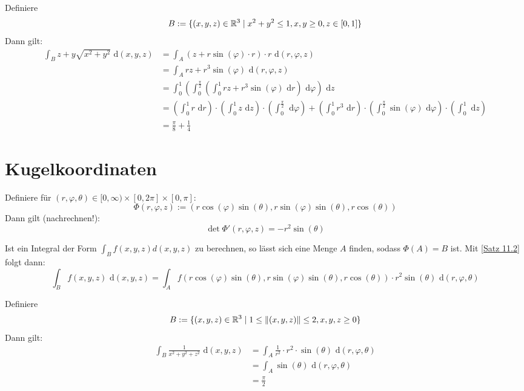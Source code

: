 \documentclass[a4paper,twoside,DIV15,BCOR12mm,chapterprefix=true,headings=onelinechapter]{scrbook}
\begin{document}
\begin{beispiel}
Definiere
\[B:=\{(x,y,z)\in\mathbb{R}^3\mid x^2+y^2\le 1, x,y\ge 0,z\in[0,1]\}\]
Dann gilt:
\begin{align*}
\int_B z+y\sqrt{x^2+y^2}\text{ d}(x,y,z)&=\int_A(z+r\sin(\varphi)\cdot r)\cdot r\text{ d}(r,\varphi,z)\\
&=\int_A rz+r^3\sin(\varphi)\text{ d}(r,\varphi,z)\\
&=\int_0^1(\int_0^{\frac\pi 2}(\int_0^1 rz+r^3\sin(\varphi)\text{ d}r)\text{ d}\varphi)\text{ d}z\\
&=(\int_0^1 r\text{ d}r)\cdot(\int_0^1 z\text{ d}z)\cdot(\int_0^{\frac\pi 2} \text{ d}\varphi)+ (\int_0^1 r^3\text{ d}r)\cdot(\int_0^{\frac\pi 2} \sin(\varphi)\text{ d}\varphi)\cdot(\int_0^1 \text{ d}z)\\
&= \frac\pi 8+\frac14
\end{align*}
\end{beispiel}

\section{Kugelkoordinaten}
Definiere für $(r,\varphi,\theta)\in [0,\infty)\times[0,2\pi]\times[0,\pi]$:
\[\Phi(r,\varphi,z):=(r\cos(\varphi)\sin(\theta),r\sin(\varphi)\sin(\theta),r\cos(\theta))\]
Dann gilt (nachrechnen!):
\[\det\Phi'(r,\varphi,z)= -r^2\sin(\theta)\]

\begin{bemerkung}
Ist ein Integral der Form $\int_B f(x,y,z) d(x,y,z)$ zu berechnen, so lässt sich eine Menge $A$ finden, sodass $\Phi(A) = B$ ist.
Mit \ref{Satz 11.2} folgt dann:
\[\int_B f(x,y,z) \text{ d}(x,y,z) = \int_A f(r\cos(\varphi)\sin(\theta),r\sin(\varphi)\sin(\theta),r\cos(\theta)) \cdot r^2\sin(\theta) \text{ d}(r,\varphi,\theta)\]
\end{bemerkung}

\begin{beispiel}
Definiere
\[B:=\{(x,y,z)\in\mathbb{R}^3\mid 1\le \|(x,y,z)\|\le 2, x,y,z\ge 0\}\]
Dann gilt:
\begin{align*}
\int_B \frac1{x^2+y^2+z^2}\text{ d}(x,y,z)&=\int_A \frac1{r^2}\cdot r^2\cdot\sin(\theta)\text{ d}(r,\varphi,\theta)\\
&=\int_A \sin(\theta)\text{ d}(r,\varphi,\theta)\\
&=\frac\pi2
\end{align*}
\end{beispiel}
\end{document}
